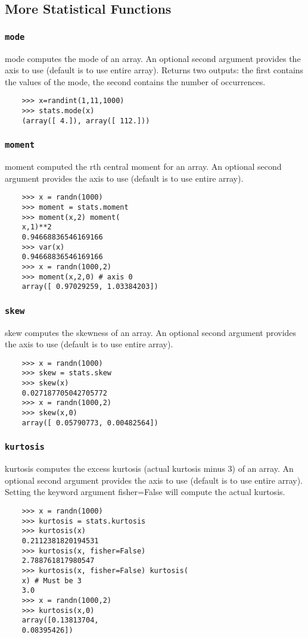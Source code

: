 \documentclass[KSmain.tex]{subfiles}
\begin{document}
\subsection{More Statistical Functions}
\subsubsection*{\texttt{mode}}
mode computes the mode of an array. An optional second argument provides the axis to use (default is to
use entire array). Returns two outputs: the first contains the values of the mode, the second contains the
number of occurrences.
\begin{framed}
	\begin{verbatim}
	>>> x=randint(1,11,1000)
	>>> stats.mode(x)
	(array([ 4.]), array([ 112.]))
	\end{verbatim}
\end{framed}
\subsubsection*{\texttt{moment}}
moment computed the rth central moment for an array. An optional second argument provides the axis to
use (default is to use entire array).
\begin{framed}
	\begin{verbatim}
	>>> x = randn(1000)
	>>> moment = stats.moment
	>>> moment(x,2) moment(
	x,1)**2
	0.94668836546169166
	>>> var(x)
	0.94668836546169166
	>>> x = randn(1000,2)
	>>> moment(x,2,0) # axis 0
	array([ 0.97029259, 1.03384203])
	\end{verbatim}
\end{framed}
\subsubsection*{\texttt{skew}}
skew computes the skewness of an array. An optional second argument provides the axis to use (default is
to use entire array).
\begin{framed}
	\begin{verbatim}
	>>> x = randn(1000)
	>>> skew = stats.skew
	>>> skew(x)
	0.027187705042705772
	>>> x = randn(1000,2)
	>>> skew(x,0)
	array([ 0.05790773, 0.00482564])
	\end{verbatim}
\end{framed}
\subsubsection*{\texttt{kurtosis}}
kurtosis computes the excess kurtosis (actual kurtosis minus 3) of an array. An optional second argument
provides the axis to use (default is to use entire array). Setting the keyword argument fisher=False will
compute the actual kurtosis.
\begin{framed}
	\begin{verbatim}
	>>> x = randn(1000)
	>>> kurtosis = stats.kurtosis
	>>> kurtosis(x)
	0.2112381820194531
	>>> kurtosis(x, fisher=False)
	2.788761817980547
	>>> kurtosis(x, fisher=False) kurtosis(
	x) # Must be 3
	3.0
	>>> x = randn(1000,2)
	>>> kurtosis(x,0)
	array([0.13813704,
	0.08395426])
	\end{verbatim}
\end{framed}
\end{document}
